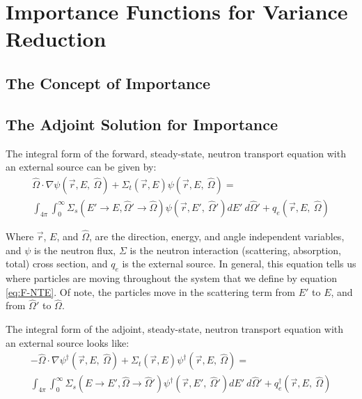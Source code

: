 \section{Importance Functions for Variance Reduction}
\label{sec:Importance}

\subsection{The Concept of Importance}

\subsection{The Adjoint Solution for Importance}
\label{sec:AdjointImportance}

The integral form of the forward, steady-state, neutron transport equation with an external source can be given by:
\begin{multline}
\hat\Omega \cdot \nabla \psi (\vec {r} ,E,\:\hat\Omega)+\Sigma _{ t }(\vec{r},E)\psi (\vec { r } ,E,\:\hat\Omega) = \\ 
\int _{ 4\pi  } \int _{ 0 }^{ \infty  } \Sigma _{ s }(E'\rightarrow E, \hat\Omega'\rightarrow\hat\Omega)\psi (\vec { r } ,E',\: \hat\Omega')dE' \:d\hat\Omega' + q_{e}(\vec { r } ,E, \:\hat\Omega)
\end{multline}
\label{eq:F-NTE}

Where $\vec { r }$, $E$, and $\hat\Omega$, are the direction, energy, and angle independent variables, and $\psi$ is the neutron flux, $\Sigma$ is the neutron interaction (scattering, absorption, total) cross section, and $q_{e}$ is the external source. In general, this equation tells us where particles are moving throughout the system that we define by equation \ref{eq:F-NTE}. Of note, the particles move in the scattering term from $E'$ to $E$, and from $\hat\Omega'$ to $\hat\Omega$. 

The integral form of the adjoint, steady-state, neutron transport equation with an external source looks like:
\begin{multline}
-\hat\Omega \cdot \nabla \psi^{\dagger} (\vec {r} ,E,\:\hat\Omega)+\Sigma _{ t }(\vec{r},E)\psi^{\dagger}  (\vec { r } ,E,\:\hat\Omega)
= \\  
 \int _{ 4\pi  } \int _{ 0 }^{ \infty  } \Sigma _{ s }(E\rightarrow E', \hat\Omega\rightarrow\hat\Omega')\psi^{\dagger}  (\vec { r } ,E',\: \hat\Omega')dE' \:d\hat\Omega' + q_{e}^\dagger(\vec { r } ,E, \:\hat\Omega)
\end{multline}
\label{eq:A-NTE}

